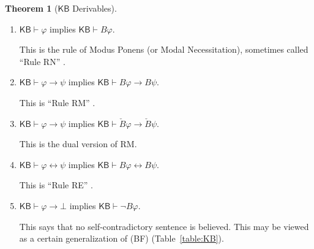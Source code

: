\documentclass[12pt]{article}
\theoremstyle{definition}
\newtheorem{theorem}{Theorem}[section]
\newcommand{\KB}{{\mathsf{KB}}}                 %
\begin{document}
\begin{theorem}[$\KB$ Derivables]
\begin{enumerate}
  \item $\KB\vdash\varphi$ implies $\KB\vdash B\varphi$.
    \label{derivables:B-nec}

    This is the rule of Modus Ponens (or Modal Necessitation),
    sometimes called ``Rule RN'' \cite[Ch.~8]{Chellas:ml}.

  \item $\KB\vdash\varphi\to\psi$ implies $\KB\vdash B\varphi\to B\psi$.
    \label{derivables:Bimp}

    This is ``Rule RM'' \cite[Ch.~8]{Chellas:ml}.

  \item $\KB\vdash\varphi\to\psi$ implies $\KB\vdash\check
    B\varphi\to\check B\psi$.
    \label{derivables:check-Bimp}
    
    This is the dual version of RM.
    
  \item $\KB\vdash\varphi\leftrightarrow\psi$ implies
    $\KB\vdash B\varphi\leftrightarrow B\psi$.
    \label{derivables:RE}

    This is ``Rule RE'' \cite[Ch.~8]{Chellas:ml}.

  \item $\KB\vdash\varphi\to\bot$ implies $\KB\vdash\lnot
    B\varphi$. \label{derivables:GBF}

    This says that no self-contradictory sentence is believed.  This
    may be viewed as a certain generalization of (BF)
    (Table~\ref{table:KB}).
  \end{enumerate}
\end{theorem}
\end{document}
